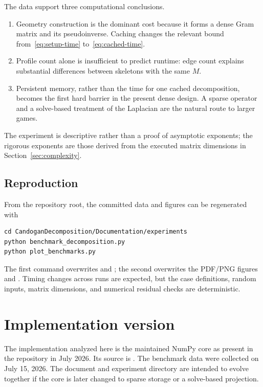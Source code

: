 \documentclass[11pt]{article}
\begin{document}
The data support three computational conclusions.
\begin{enumerate}
 \item Geometry construction is the dominant cost because it forms a dense
       Gram matrix and its pseudoinverse.  Caching changes the relevant bound
       from~\eqref{eq:setup-time} to~\eqref{eq:cached-time}.
 \item Profile count alone is insufficient to predict runtime: edge count
       explains substantial differences between skeletons with the same $M$.
 \item Persistent memory, rather than the time for one cached decomposition,
       becomes the first hard barrier in the present dense design.  A sparse
       operator and a solve-based treatment of the Laplacian are the natural
       route to larger games.
\end{enumerate}
The experiment is descriptive rather than a proof of asymptotic exponents;
the rigorous exponents are those derived from the executed matrix dimensions
in Section~\ref{sec:complexity}.

\subsection{Reproduction}

From the repository root, the committed data and figures can be regenerated
with
\begin{verbatim}
cd CandoganDecomposition/Documentation/experiments
python benchmark_decomposition.py
python plot_benchmarks.py
\end{verbatim}
The first command overwrites  and
; the second overwrites the PDF/PNG figures and
.  Timing changes across runs are expected, but the
case definitions, random inputs, matrix dimensions, and numerical residual
checks are deterministic.

\section*{Implementation version}

The implementation analyzed here is the maintained NumPy core as present in
the repository in July 2026.  Its source is
.  The benchmark data were
collected on July 15, 2026.  The document and experiment directory are intended
to evolve together if the core is later changed to sparse storage or a
solve-based projection.
\end{document}

